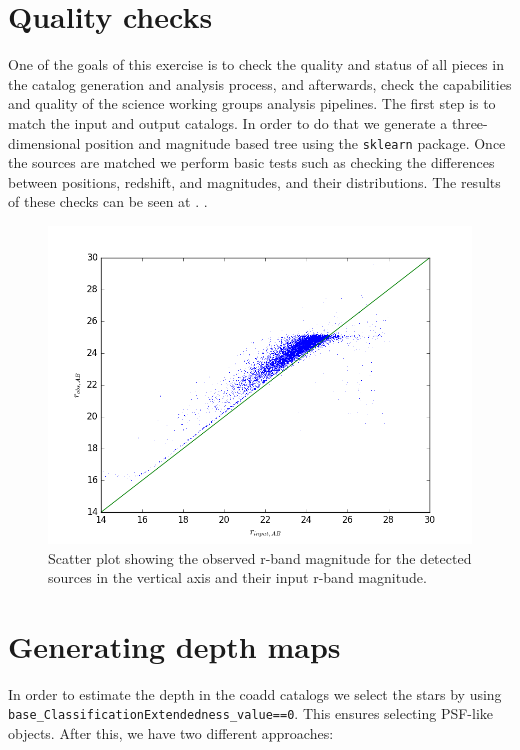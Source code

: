 \documentclass[\docopts]{\docclass}
\begin{document}
\section{Quality checks}
\label{sec:quality}

One of the goals of this exercise is to check the quality and status of all pieces in the catalog generation and analysis process, and afterwards, check the capabilities and quality of the science working groups analysis pipelines. The first step is to match the input and output catalogs. In order to do that we generate a three-dimensional position and magnitude based tree using the \texttt{sklearn} package. Once the sources are matched we perform basic tests such as checking the differences between positions, redshift, and magnitudes, and their distributions. The results of these checks can be seen at . .

\begin{figure}
\centering
\includegraphics[width=0.9\columnwidth]{mag_scatter.png}
\caption{Scatter plot showing the observed r-band magnitude for the detected sources in the vertical axis and their input r-band magnitude.}
\label{fig:basic_tests}
\end{figure}


\section{Generating depth maps}
\label{sec:masking}

In order to estimate the depth in the coadd catalogs we select the stars by using \texttt{base\_ClassificationExtendedness\_value==0}. This ensures selecting
PSF-like objects. After this, we have two different approaches:
\end{document}
